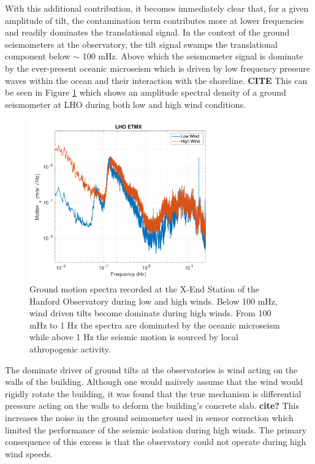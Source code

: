 \documentclass [12pt, proquest]{uwthesis}[2019]
\begin{document}
With this additional contribution, it becomes immediately clear that, for a given amplitude of tilt, the contamination term contributes more at lower frequencies and readily dominates the translational signal. In the context of the ground seismometers at the observatory, the tilt signal swamps the translational component below $\sim$ 100 mHz. Above which the seismometer signal is dominate by the ever-present oceanic microseism which is driven by low frequency pressure waves within the ocean and their interaction with the shoreline. \textbf{CITE} This can be seen in Figure \ref{wind} which shows an amplitude spectral density of a ground seismometer at LHO during both low and high wind conditions.

\begin{figure}%
\begin{center}
\includegraphics[width=0.75\textwidth]{windComp.pdf}
\caption[Ground motion spectra during low and high winds]{Ground motion spectra recorded at the X-End Station of the Hanford Observatory during low and high winds. Below 100 mHz, wind driven tilts become dominate during high winds. From 100 mHz to 1 Hz the spectra are dominated by the oceanic microseism while above 1 Hz the seismic motion is sourced by local athropogenic activity.}
\label{wind}
\end{center}
\end{figure}

The dominate driver of ground tilts at the observatories is wind acting on the walls of the building. Although one would naiively assume that the wind would rigidly rotate the building, it was found that the true mechanism is differential pressure acting on the walls to deform the building's concrete slab. \textbf{cite?} This increases the noise in the ground seimometer used in sensor correction which limited the performance of the seismic isolation during high winds. The primary consequence of this excess is that the observatory could not operate during high wind speeds.
\end{document}
